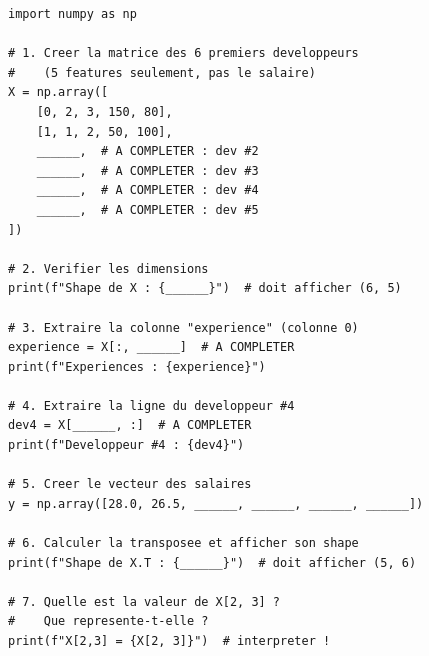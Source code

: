 \begin{pythonbox}
\begin{lstlisting}
import numpy as np

# 1. Creer la matrice des 6 premiers developpeurs
#    (5 features seulement, pas le salaire)
X = np.array([
    [0, 2, 3, 150, 80],
    [1, 1, 2, 50, 100],
    ______,  # A COMPLETER : dev #2
    ______,  # A COMPLETER : dev #3
    ______,  # A COMPLETER : dev #4
    ______,  # A COMPLETER : dev #5
])

# 2. Verifier les dimensions
print(f"Shape de X : {______}")  # doit afficher (6, 5)

# 3. Extraire la colonne "experience" (colonne 0)
experience = X[:, ______]  # A COMPLETER
print(f"Experiences : {experience}")

# 4. Extraire la ligne du developpeur #4
dev4 = X[______, :]  # A COMPLETER
print(f"Developpeur #4 : {dev4}")

# 5. Creer le vecteur des salaires
y = np.array([28.0, 26.5, ______, ______, ______, ______])

# 6. Calculer la transposee et afficher son shape
print(f"Shape de X.T : {______}")  # doit afficher (5, 6)

# 7. Quelle est la valeur de X[2, 3] ?
#    Que represente-t-elle ?
print(f"X[2,3] = {X[2, 3]}")  # interpreter !
\end{lstlisting}
\end{pythonbox}


